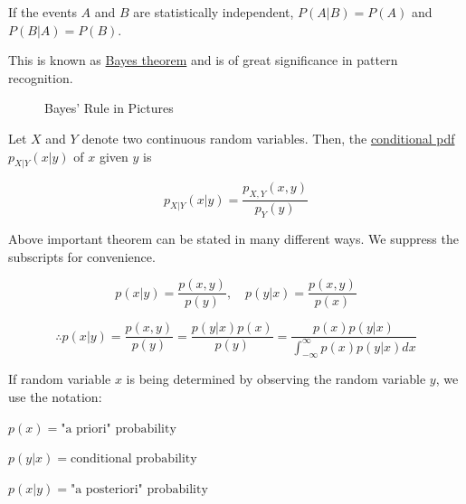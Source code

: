 \documentclass[fleqn]{article}
\begin{document}
	If the events $A$ and $B$ are statistically independent, $P(A|B) = P(A)$ and $P(B|A) = P(B)$.
	
	This is known as \underline{Bayes theorem} and is of great significance in pattern recognition.
	
	\begin{figure}[H]
		\centerline{}
		\caption{Bayes' Rule in Pictures}
		\label{bayes_rule}
	\end{figure}
	
	Let $X$ and $Y$ denote two continuous random variables. Then, the \newline \underline{conditional pdf} $p_{X|Y}(x|y)$ of $x$ given $y$ is
	
	\begin{equation*}
		p_{X|Y}(x|y) = \frac{p_{X,Y}(x,y)}{p_Y(y)}
	\end{equation*}
	
	Above important theorem can be stated in many different ways. We suppress the subscripts for convenience.
	
	\begin{equation*}
		p(x|y) = \frac{p(x,y)}{p(y)},\quad p(y|x) = \frac{p(x,y)}{p(x)}
	\end{equation*}
	
	\begin{equation*}
		\therefore p(x|y) = \frac{p(x,y)}{p(y)} = \frac{p(y|x)p(x)}{p(y)} = \frac{p(x)p(y|x)}{\int_{-\infty}^{\infty}{p(x)p(y|x)dx}}
	\end{equation*}
	
	If random variable $x$ is being determined by observing the random variable $y$, we use the notation:
	
	$p(x) = \text{"a priori" probability}$
	
	$p(y|x) = \text{conditional probability}$
	
	$p(x|y) = \text{"a posteriori" probability}$ 
\end{document}
